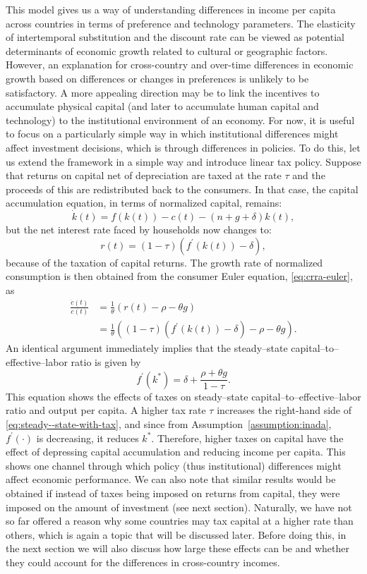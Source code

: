 \documentclass[\topdir/lecture\_notes.tex]{subfiles}
\begin{document}
This model gives us a way of understanding differences in income per capita across countries in terms of preference and technology parameters. The elasticity of intertemporal substitution and the discount rate can be viewed as potential determinants of economic growth related to cultural or geographic factors. However, an explanation for cross-country and over-time differences in economic growth based on differences or changes in preferences is unlikely to be satisfactory. A more appealing direction may be to link the incentives to accumulate physical capital (and later to accumulate human capital and technology) to the institutional environment of an economy. For now, it is useful to focus on a particularly simple way in which institutional differences might affect investment decisions, which is through differences in policies. To do this, let us extend the framework in a simple way and introduce
linear tax policy. Suppose that returns on capital net of depreciation are taxed at the rate \(\tau\) and the proceeds of this are redistributed back to the consumers. In that case, the capital accumulation equation, in terms of normalized capital, remains:
\[
  \dot{k}(t)=f(k(t))-c(t)-(n+g+\delta) k(t),
\]
but the net interest rate faced by households now changes to:
\[
  r(t)=(1-\tau)\left(f^{\prime}(k(t))-\delta\right),
\]
because of the taxation of capital returns. The growth rate of normalized consumption is then obtained from the consumer Euler equation, \eqref{eq:crra-euler}, as
\[
  \begin{aligned}
    \frac{\dot{c}(t)}{c(t)} & =\frac{1}{\theta}(r(t)-\rho-\theta g)                                                    \\
                            & =\frac{1}{\theta}\left((1-\tau)\left(f^{\prime}(k(t))-\delta\right)-\rho-\theta g\right).
  \end{aligned}
\]
An identical argument immediately implies that the steady--state capital--to--effective--labor ratio is given by
\begin{equation}
  f^{\prime}\left(k^{*}\right)=\delta+\frac{\rho+\theta g}{1-\tau}.
  \label{eq:steady--state-with-tax}
\end{equation}
This equation shows the effects of taxes on steady--state capital--to--effective--labor ratio and output per capita. A higher tax rate \(\tau\) increases the right-hand side of \eqref{eq:steady--state-with-tax}, and since from Assumption~\ref{assumption:inada}, \(f^{\prime}(\cdot)\) is decreasing, it reduces \(k^{*}\). Therefore, higher taxes on capital have the effect of depressing capital accumulation and reducing income per capita. This shows one channel through which policy (thus institutional) differences might affect economic performance. We can also note that similar results would be obtained if instead of taxes being imposed on returns from capital, they were imposed on the amount of investment (see next section). Naturally, we have not so far offered a reason why some countries may tax capital at a higher rate than others, which is again a topic that will be discussed later. Before doing this, in the next section we will also discuss how large these effects can be and whether they could account for the differences in cross-country incomes.
\end{document}
